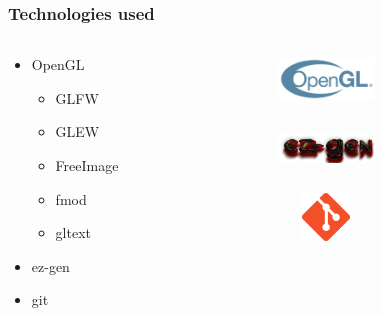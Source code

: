 \documentclass{beamer}
\begin{document}
\begin{frame}
\frametitle{Technologies used}
\begin{columns}[T]
\begin{column}{0.3\textwidth}
\begin{itemize}
\item OpenGL
    \begin {itemize}
    \item GLFW
    \item GLEW
    \item FreeImage
    \item fmod
    \item gltext
    \end {itemize}
\item ez-gen
\item git
\end{itemize}
\end{column}
\begin{column}{0.7\textwidth}
    \begin {figure}
    \includegraphics[width=1in,height=0.50in]{opengl-logo}
    \end {figure}
    \begin {figure}
    \includegraphics[width=1in,height=0.55in]{ez-gen}
    \end {figure}
    \begin {figure}
    \includegraphics[width=1in,height=0.50in]{git-logo}
    \end {figure}

\end{column}
\end{columns}
\end{frame}

\end{document}

